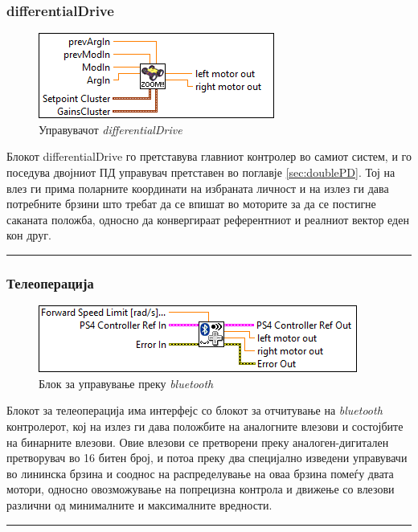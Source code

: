 \documentclass[11pt]{article}
\begin{document}
    \subsubsection{differentialDrive}
	    \begin{figure}[H]
	      \includegraphics[width=0.55\linewidth]{./images/differential_drive_border.png}
		    \caption{Управувачот \textit{differentialDrive}}
	      \label{fig:diffDrive}
	      \raggedright
	      \end{figure}
      Блокот differentialDrive го претставува главниот контролер во самиот систем, и го поседува двојниот ПД управувач претставен во поглавје \ref{sec:doublePD}. Тој на влез ги прима поларните координати на избраната личност и на излез ги дава потребните брзини што требат да се впишат во моторите за да се постигне саканата положба, односно да конвергираат референтниот и реалниот вектор еден кон друг.
      \\
      \textcolor[RGB]{150,150,150}{\rule{\linewidth}{1.6pt}}

    \subsubsection{Телеоперација}
	    \begin{figure}[H]
	      \includegraphics[width=0.55\linewidth]{./images/teleop_tooltip_border.png}
		    \caption{Блок за управување преку \textit{bluetooth}}
	      \label{fig:teleop}
	      \raggedright
	      \end{figure}
	    Блокот за телеоперација има интерфејс со блокот за отчитување на \textit{bluetooth} контролерот, кој на излез ги дава положбите на аналогните влезови и состојбите на бинарните влезови. Овие влезови се претворени преку аналоген-дигитален претворувач во 16 битен број, и потоа преку два специјално изведени управувачи во лининска брзина и сооднос на распределување на оваа брзина помеѓу двата мотори, односно овозможување на попрецизна контрола и движење со влезови различни од минималните и максималните вредности.\\
      \textcolor[RGB]{150,150,150}{\rule{\linewidth}{1.6pt}}
\end{document}
